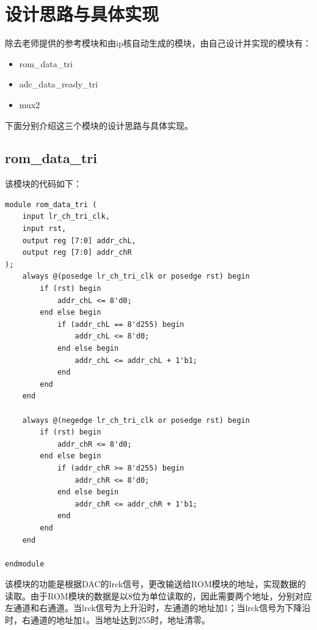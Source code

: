 \documentclass[UTF8]{ctexart}
\begin{document}
\FloatBarrier
\section{设计思路与具体实现}
除去老师提供的参考模块和由ip核自动生成的模块，由自己设计并实现的模块有：
\begin{itemize}
    \item rom\_data\_tri
    \item adc\_data\_ready\_tri
    \item mux2
\end{itemize}

下面分别介绍这三个模块的设计思路与具体实现。

\subsection{rom\_data\_tri}
该模块的代码如下：
\begin{framed}
    \begin{lstlisting}[style=verilogStyle]
module rom_data_tri (
    input lr_ch_tri_clk,
    input rst,
    output reg [7:0] addr_chL,
    output reg [7:0] addr_chR
);
    always @(posedge lr_ch_tri_clk or posedge rst) begin
        if (rst) begin
            addr_chL <= 8'd0;
        end else begin
            if (addr_chL == 8'd255) begin
                addr_chL <= 8'd0;
            end else begin
                addr_chL <= addr_chL + 1'b1;
            end
        end
    end

    always @(negedge lr_ch_tri_clk or posedge rst) begin
        if (rst) begin
            addr_chR <= 8'd0;
        end else begin
            if (addr_chR >= 8'd255) begin
                addr_chR <= 8'd0;
            end else begin
                addr_chR <= addr_chR + 1'b1;
            end
        end
    end

endmodule
    \end{lstlisting}
\end{framed}

该模块的功能是根据DAC的lrck信号，更改输送给ROM模块的地址，实现数据的读取。由于ROM模块的数据是以8位为单位读取的，因此需要两个地址，分别对应左通道和右通道。当lrck信号为上升沿时，左通道的地址加1；当lrck信号为下降沿时，右通道的地址加1。当地址达到255时，地址清零。
\end{document}
